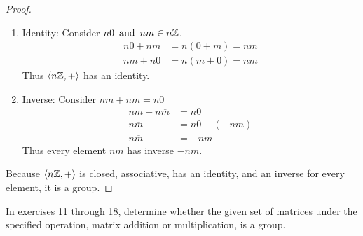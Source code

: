 \documentclass{article}
\begin{document}
\begin{enumerate}
{\begin{enumerate}
{\begin{proof}
\begin{enumerate}
                        \item Identity: Consider $n0 \operatorname{~\text{and}~} nm \in n\mathbb{Z}$.
                        \begin{align*}
                            n0 + nm & = n(0+m) = nm \\
                            nm + n0 & = n(m+0) = nm
                        \end{align*}
                        Thus $\langle n\mathbb{Z}, + \rangle$ has an identity.
                        
                        \item Inverse: Consider $nm + n\overline{m} = n0$
                        \begin{align*}
                            nm + n\overline{m} & = n0 \\
                            n\overline{m} & = n0 + (-nm) \\
                            n\overline{m} & = -nm
                        \end{align*}
                        Thus every element $nm$ has inverse $-nm$.
                    \end{enumerate}
                    Because $\langle n\mathbb{Z}, + \rangle$ is closed, associative, has an identity, and an inverse for every element, it is a group.
                \end{proof}
            }
        \end{enumerate}
    }
\end{enumerate}
In exercises 11 through 18, determine whether the given set of matrices under the specified operation, matrix addition or multiplication, is a group.
\begin{enumerate}
\end{enumerate}
\end{document}
